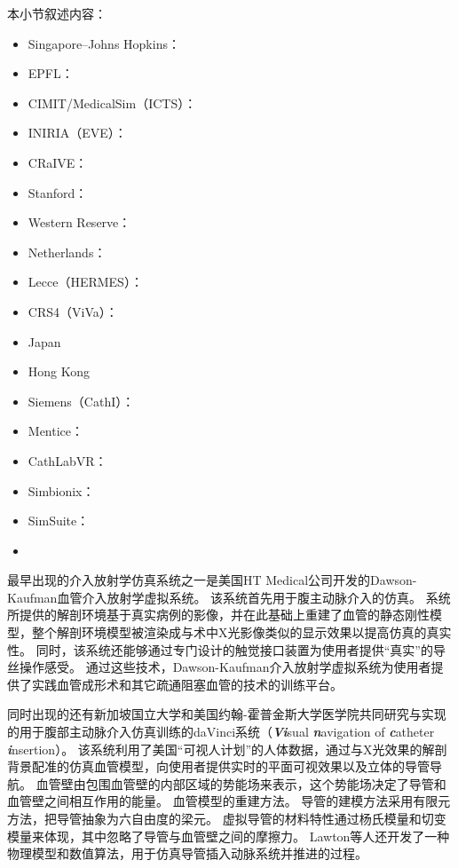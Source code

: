 本小节叙述内容：
\begin{itemize}
  \item Singapore--Johns Hopkins：
  \cite{chui2002simulation}
  \cite{cai2003}\cite{cai2004}\cite{cai2006}
  \cite{Li2007}\cite{Li2006}
  \cite{Chiang2011}
  \item EPFL：
  \item CIMIT/MedicalSim（ICTS）：
  \item INIRIA（EVE）：
  \item CRaIVE：
  \item Stanford：
  \item Western Reserve：
  \item Netherlands：
  \item Lecce（HERMES）：
  \item CRS4（ViVa）：\cite{abdoulaev1998}\cite{Zorcolo2000}\cite{Gobbetti1998}\cite{Gobbetti2000}\cite{Zorcolo1999}
  \item Japan
  \item Hong Kong
  \item Siemens（CathI）：
  \item Mentice：\cite{menticeweb}
  \item CathLabVR：\cite{caeweb}
  \item Simbionix：\cite{simbionixweb}
  \item SimSuite：\cite{simsuiteweb}
  \item \cite{Rahman2012}
\end{itemize}

最早出现的介入放射学仿真系统之一是美国HT Medical公司开发的Dawson-Kaufman血管介入放射学虚拟系统\cite{Higgins1995DK}\cite{Dawson1996DK}\cite{meglan1996DK}。
该系统首先用于腹主动脉介入的仿真\cite{Wang1998ICard}。
系统所提供的解剖环境基于真实病例的影像，并在此基础上重建了血管的静态刚性模型，整个解剖环境模型被渲染成与术中X光影像类似的显示效果以提高仿真的真实性\cite{Higgins1995DK}。
同时，该系统还能够通过专门设计的触觉接口装置为使用者提供“真实”的导丝操作感受\cite{BroNielsen1997DK}。
通过这些技术，Dawson-Kaufman介入放射学虚拟系统为使用者提供了实践血管成形术和其它疏通阻塞血管的技术的训练平台。

同时出现的还有新加坡国立大学和美国约翰-霍普金斯大学医学院共同研究与实现的用于腹部主动脉介入仿真训练的daVinci系统（\textbf{\textit{Vi}}sual \textbf{\textit{n}}avigation of \textbf{\textit{c}}atheter \textbf{\textit{i}}nsertion\cite{Lawton2000daVinci}）\cite{Anderson1996daVinci}\cite{Anderson1996adaVinci}\cite{Anderson1997daVinci}\cite{Anderson1997adaVinci}。
该系统利用了美国“可视人计划”\cite{vhpweb}的人体数据，通过与X光效果的解剖背景配准的仿真血管模型，向使用者提供实时的平面可视效果以及立体的导管导航\cite{Anderson1998daVinci}。
血管壁由包围血管壁的内部区域的势能场来表示，这个势能场决定了导管和血管壁之间相互作用的能量\cite{Chui1996daVinci}\cite{Wang1996daVinci}。
血管模型的重建方法\cite{Nguyen1994Vessel}。
导管的建模方法采用有限元方法，把导管抽象为六自由度的梁元。
虚拟导管的材料特性通过杨氏模量和切变模量来体现，其中忽略了导管与血管壁之间的摩擦力\cite{Anderson1998daVinci}。
Lawton等人\cite{Lawton2000daVinci}还开发了一种物理模型和数值算法，用于仿真导管插入动脉系统并推进的过程。

